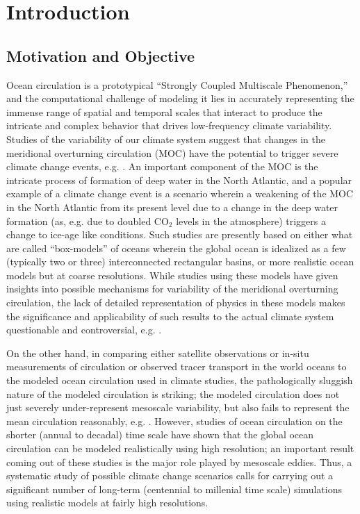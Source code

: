 \chapter{Introduction}
\label{chapter:1}

\section{Motivation and Objective}

Ocean circulation is a prototypical ``Strongly Coupled Multiscale
Phenomenon,'' and the computational challenge of modeling it lies in
accurately representing the immense range of spatial and temporal
scales that interact to produce the intricate and complex behavior
that drives low-frequency climate variability.  Studies of the
variability of our climate system suggest that changes in the
meridional overturning circulation (MOC) have the potential to trigger
severe climate change events, e.g. \cite{clark}.  An
important component of the MOC is the intricate process of formation
of deep water in the North Atlantic, and a popular example of a
climate change event is a scenario wherein a weakening of the MOC in
the North Atlantic from its present level due to a change in the
deep water formation (as, e.g. due to doubled CO$_2$ levels in the
atmosphere) triggers a change to ice-age like
conditions\cite{clark,wood}.  Such studies are presently based on
either what are called ``box-models'' of oceans wherein the global
ocean is idealized as a few (typically two or three) interconnected
rectangular basins, or more realistic ocean models but at coarse
resolutions.  While studies using these models have given insights
into possible mechanisms for variability of the meridional overturning circulation, the lack of detailed representation of physics in these
models makes the significance and applicability of such results to
the actual climate system questionable and controversial, e.g. \cite{gent}.

On the other hand, in comparing either satellite observations or
in-situ measurements of circulation or observed tracer transport in
the world oceans to the modeled ocean circulation used in climate
studies, the pathologically sluggish nature of the modeled
circulation is striking; the modeled circulation does not just
severely under-represent mesoscale variability, but also fails to
represent the mean circulation reasonably, e.g. \cite{IPCC}.
However, studies of ocean circulation on the shorter (annual to
decadal) time scale have shown that the global ocean circulation can
be modeled realistically using high resolution\cite{Smith}; an
important result coming out of these studies is the major role
played by mesoscale eddies.  Thus, a systematic study of possible
climate change scenarios calls for carrying out a significant number
of long-term (centennial to millenial time scale) simulations using
realistic models at fairly high resolutions.

